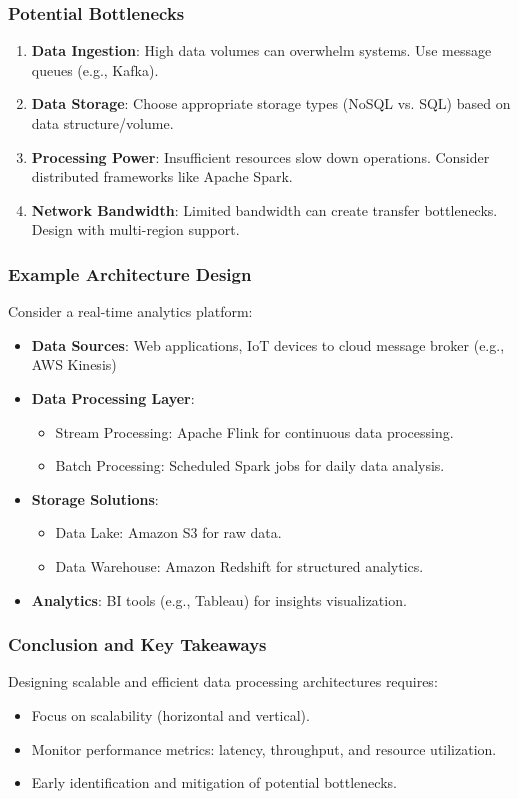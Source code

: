 \documentclass[aspectratio=169]{beamer}
\begin{document}
\begin{frame}[fragile]
    \frametitle{Potential Bottlenecks}
    \begin{enumerate}
        \item \textbf{Data Ingestion}: High data volumes can overwhelm systems. Use message queues (e.g., Kafka).
        \item \textbf{Data Storage}: Choose appropriate storage types (NoSQL vs. SQL) based on data structure/volume.
        \item \textbf{Processing Power}: Insufficient resources slow down operations. Consider distributed frameworks like Apache Spark.
        \item \textbf{Network Bandwidth}: Limited bandwidth can create transfer bottlenecks. Design with multi-region support.
    \end{enumerate}
\end{frame}

\begin{frame}[fragile]
    \frametitle{Example Architecture Design}
    Consider a real-time analytics platform:
    \begin{itemize}
        \item \textbf{Data Sources}: Web applications, IoT devices to cloud message broker (e.g., AWS Kinesis)
        \item \textbf{Data Processing Layer}:
        \begin{itemize}
            \item Stream Processing: Apache Flink for continuous data processing.
            \item Batch Processing: Scheduled Spark jobs for daily data analysis.
        \end{itemize}
        \item \textbf{Storage Solutions}:
        \begin{itemize}
            \item Data Lake: Amazon S3 for raw data.
            \item Data Warehouse: Amazon Redshift for structured analytics.
        \end{itemize}
        \item \textbf{Analytics}: BI tools (e.g., Tableau) for insights visualization.
    \end{itemize}
\end{frame}

\begin{frame}[fragile]
    \frametitle{Conclusion and Key Takeaways}
    Designing scalable and efficient data processing architectures requires:
    \begin{itemize}
        \item Focus on scalability (horizontal and vertical).
        \item Monitor performance metrics: latency, throughput, and resource utilization.
        \item Early identification and mitigation of potential bottlenecks.
    \end{itemize}
\end{frame}
\end{document}
